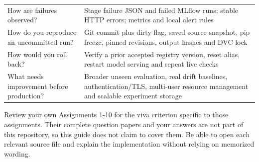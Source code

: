 \documentclass[11pt,a4paper]{article}
\begin{document}
\begin{longtable}{@{}>{\raggedright\arraybackslash}p{0.5000\dimexpr\textwidth-12pt\relax}>{\raggedright\arraybackslash}p{0.5000\dimexpr\textwidth-12pt\relax}@{}}
How are failures observed? & Stage failure JSON and failed MLflow runs; stable HTTP errors; metrics and local alert rules \\
How do you reproduce an uncommitted run? & Git commit plus dirty flag, saved source snapshot, pip freeze, pinned revisions, output hashes and DVC lock \\
How would you roll back? & Verify a prior accepted registry version, reset alias, restart model serving and repeat live checks \\
What needs improvement before production? & Broader unseen evaluation, real drift baselines, authentication/TLS, multi-user resource management and scalable experiment storage \\
\bottomrule
\end{longtable}
\endgroup
Review your own Assignments 1-10 for the viva criterion specific to those assignments. Their complete question papers and your answers are not part of this repository, so this guide does not claim to cover them. Be able to open each relevant source file and explain the implementation without relying on memorized wording.
\end{document}
